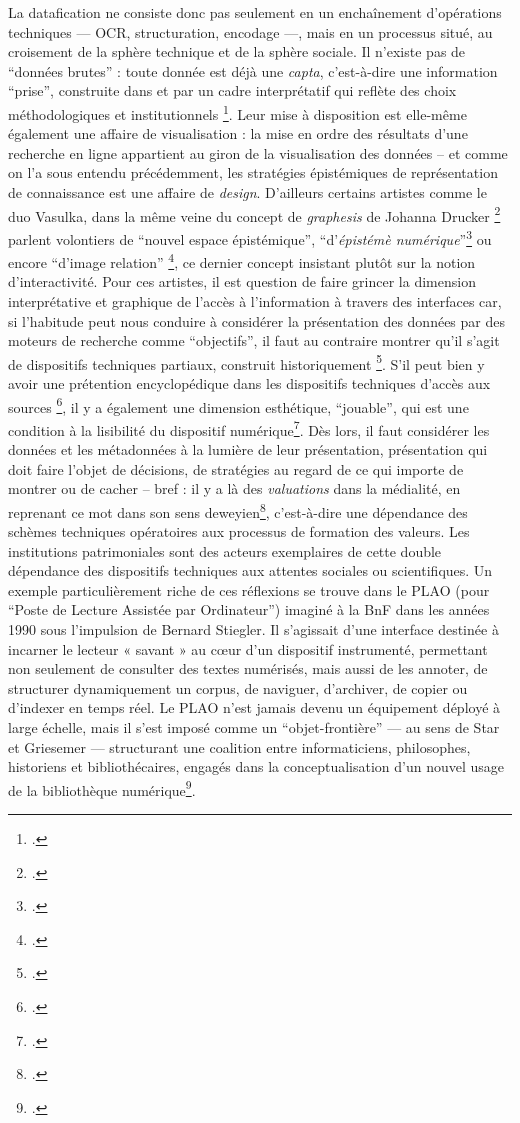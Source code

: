 La datafication ne consiste donc pas seulement en un enchaînement d’opérations techniques — OCR, structuration, encodage —, mais en un processus situé, au croisement de la sphère technique et de la sphère sociale. Il n’existe pas de \enquote{données brutes} : toute donnée est déjà une \emph{capta}, c’est-à-dire une information \enquote{prise}, construite dans et par un cadre interprétatif qui reflète des choix méthodologiques et institutionnels \footcite[][]{drucker}. Leur mise à disposition est elle-même également une affaire de visualisation : la mise en ordre des résultats d'une recherche en ligne appartient au giron de la visualisation des données -- et comme on l'a sous entendu précédemment, les stratégies épistémiques de représentation de connaissance est une affaire de \emph{design}. D'ailleurs certains artistes comme le duo Vasulka, dans la même veine du concept de \emph{graphesis} de Johanna Drucker \footcite[][]{drucker} parlent volontiers de \enquote{nouvel espace épistémique}, \enquote{d'\emph{épistémè numérique}}\footcite[][]{dallet} ou encore \enquote{d'image relation} \footcite[][]{boissier}, ce dernier concept insistant plutôt sur la notion d'interactivité. Pour ces artistes, il est question de faire grincer la dimension interprétative et graphique de l'accès à l'information à travers des interfaces car, si l'habitude peut nous conduire à considérer la présentation des données par des moteurs de recherche comme \enquote{objectifs}, il faut au contraire montrer qu'il s'agit de dispositifs techniques partiaux, construit historiquement \footcite[][]{daston}. S'il peut bien y avoir une prétention encyclopédique dans les dispositifs techniques d'accès aux sources \footcite[][]{wagneur}, il y a également une dimension esthétique, \enquote{jouable}, qui est une condition à la lisibilité du dispositif numérique\footcite[][]{boissier}. Dès lors, il faut considérer les données et les métadonnées à la lumière de leur présentation, présentation qui doit faire l'objet de décisions, de stratégies au regard de ce qui importe de montrer ou de cacher -- bref : il y a là des \emph{valuations} dans la médialité, en reprenant ce mot dans son sens deweyien\footcite[][]{dewey}, c'est-à-dire une dépendance des schèmes techniques opératoires aux processus de formation des valeurs. Les institutions patrimoniales sont des acteurs exemplaires de cette double dépendance des dispositifs techniques aux attentes sociales ou scientifiques. Un exemple particulièrement riche de ces réflexions se trouve dans le PLAO (pour \enquote{Poste de Lecture Assistée par Ordinateur}) imaginé à la BnF dans les années 1990 sous l’impulsion de Bernard Stiegler. Il s’agissait d’une interface destinée à incarner le lecteur « savant » au cœur d’un dispositif instrumenté, permettant non seulement de consulter des textes numérisés, mais aussi de les annoter, de structurer dynamiquement un corpus, de naviguer, d’archiver, de copier ou d’indexer en temps réel. Le PLAO n’est jamais devenu un équipement déployé à large échelle, mais il s’est imposé comme un \enquote{objet-frontière} — au sens de Star et Griesemer — structurant une coalition entre informaticiens, philosophes, historiens et bibliothécaires, engagés dans la conceptualisation d’un nouvel usage de la bibliothèque numérique\footcite[][]{bequet}.

